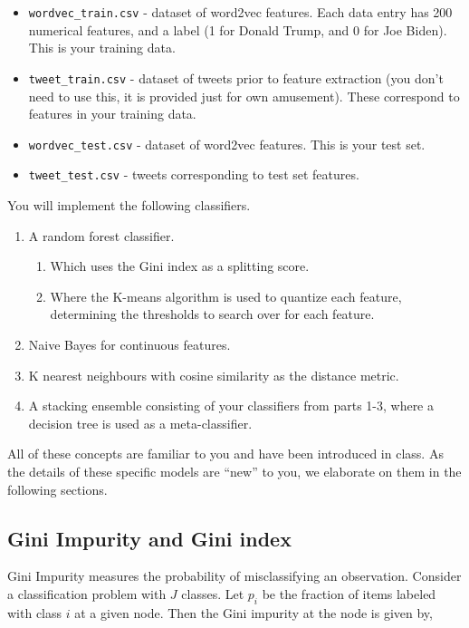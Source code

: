 \begin{itemize}
    \item \texttt{wordvec\_train.csv} - dataset of word2vec features. Each data entry has 200 numerical features, and a label (1 for Donald Trump, and 0 for Joe Biden). This is your training data.
    \item \texttt{tweet\_train.csv} - dataset of tweets prior to feature extraction (you don't need to use this, it is provided just for own amusement). These correspond to features in your training data.
    \item \texttt{wordvec\_test.csv} - dataset of word2vec features. This is your test set.
    \item \texttt{tweet\_test.csv} - tweets corresponding to test set features.
\end{itemize}


You will implement the following classifiers.

\begin{enumerate}
    \item A random forest classifier.
    \begin{enumerate}
        \item Which uses the Gini index as a splitting score.
        \item Where the K-means algorithm is used to quantize each feature, determining the thresholds to search over for each feature. 
    \end{enumerate}
    \item Naive Bayes for continuous features.
    \item K nearest neighbours with cosine similarity as the distance metric.
    \item A stacking ensemble consisting of your classifiers from parts 1-3, where a decision tree is used as a meta-classifier.
\end{enumerate}

All of these concepts are familiar to you and have been introduced in class.  As the details of these specific models are ``new'' to you, we elaborate on them in the following sections. %

\subsection*{Gini Impurity and Gini index}

Gini Impurity measures the probability of misclassifying an observation. Consider a classification problem with $J$ classes. Let $p_i$ be the fraction of items labeled with class $i$ at a given node. Then the Gini impurity at the node is given by,

